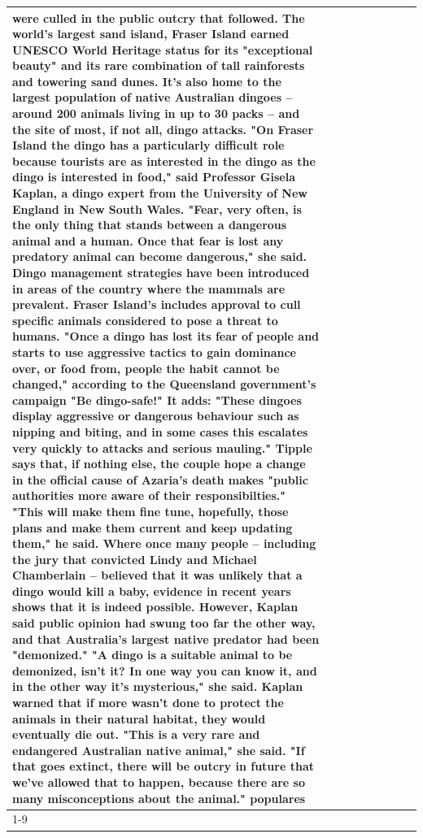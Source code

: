 \begin{table}[H]
\begin{tabular}{lllrlllll}
were culled in the public outcry that followed. The world's largest sand island, Fraser Island earned UNESCO World Heritage status for its "exceptional beauty" and its rare combination of tall rainforests and towering sand dunes. It's also home to the largest population of native Australian dingoes -- around 200 animals living in up to 30 packs -- and the site of most, if not all, dingo attacks. "On Fraser Island the dingo has a particularly difficult role because tourists are as interested in the dingo as the dingo is interested in food," said Professor Gisela Kaplan, a dingo expert from the University of New England in New South Wales. "Fear, very often, is the only thing that stands between a dangerous animal and a human. Once that fear is lost any predatory animal can become dangerous," she said. Dingo management strategies have been introduced in areas of the country where the mammals are prevalent. Fraser Island's includes approval to cull specific animals considered to pose a threat to humans. "Once a dingo has lost its fear of people and starts to use aggressive tactics to gain dominance over, or food from, people the habit cannot be changed," according to the Queensland government's campaign "Be dingo-safe!" It adds: "These dingoes display aggressive or dangerous behaviour such as nipping and biting, and in some cases this escalates very quickly to attacks and serious mauling." Tipple says that, if nothing else, the couple hope a change in the official cause of Azaria's death makes "public authorities more aware of their responsibilties." "This will make them fine tune, hopefully, those plans and make them current and keep updating them," he said. Where once many people -- including the jury that convicted Lindy and Michael Chamberlain -- believed that it was unlikely that a dingo would kill a baby, evidence in recent years shows that it is indeed possible. However, Kaplan said public opinion had swung too far the other way, and that Australia's largest native predator had been "demonized." "A dingo is a suitable animal to be demonized, isn't it? In one way you can know it, and in the other way it's mysterious," she said. Kaplan warned that if more wasn't done to protect the animals in their natural habitat, they would eventually die out. "This is a very rare and endangered Australian native animal," she said. "If that goes extinct, there will be outcry in future that we've allowed that to happen, because there are so many misconceptions about the animal." populares \\
\cline{1-9}

\end{tabular}
\end{table}
